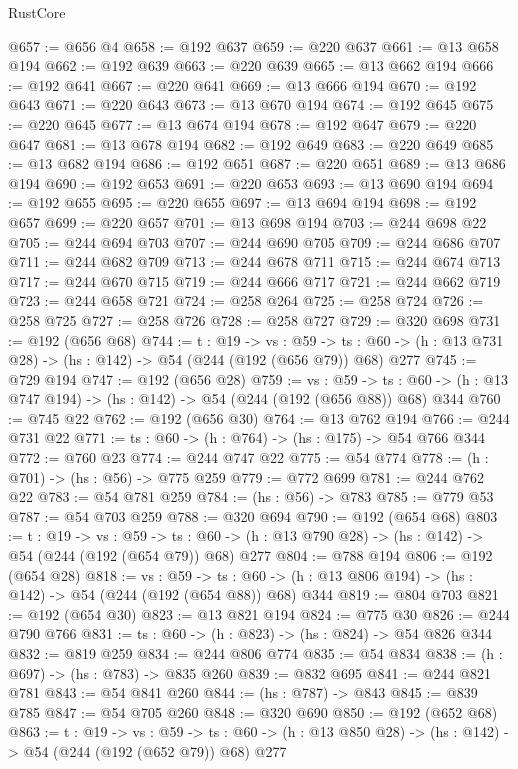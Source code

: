 \begin{lexlean}{RustCore}
\begin{coremodule}
@657 := @656 @4
@658 := @192 @637
@659 := @220 @637
@661 := @13 @658 @194
@662 := @192 @639
@663 := @220 @639
@665 := @13 @662 @194
@666 := @192 @641
@667 := @220 @641
@669 := @13 @666 @194
@670 := @192 @643
@671 := @220 @643
@673 := @13 @670 @194
@674 := @192 @645
@675 := @220 @645
@677 := @13 @674 @194
@678 := @192 @647
@679 := @220 @647
@681 := @13 @678 @194
@682 := @192 @649
@683 := @220 @649
@685 := @13 @682 @194
@686 := @192 @651
@687 := @220 @651
@689 := @13 @686 @194
@690 := @192 @653
@691 := @220 @653
@693 := @13 @690 @194
@694 := @192 @655
@695 := @220 @655
@697 := @13 @694 @194
@698 := @192 @657
@699 := @220 @657
@701 := @13 @698 @194
@703 := @244 @698 @22
@705 := @244 @694 @703
@707 := @244 @690 @705
@709 := @244 @686 @707
@711 := @244 @682 @709
@713 := @244 @678 @711
@715 := @244 @674 @713
@717 := @244 @670 @715
@719 := @244 @666 @717
@721 := @244 @662 @719
@723 := @244 @658 @721
@724 := @258 @264
@725 := @258 @724
@726 := @258 @725
@727 := @258 @726
@728 := @258 @727
@729 := @320 @698
@731 := @192 (@656 @68)
@744 := {t : @19} ->
  {vs : @59} ->
  {ts : @60} -> (h : @13 @731 @28) -> (hs : @142) -> @54 (@244 (@192 (@656 @79)) @68) @277
@745 := @729 @194
@747 := @192 (@656 @28)
@759 := {vs : @59} ->
  {ts : @60} -> (h : @13 @747 @194) -> (hs : @142) -> @54 (@244 (@192 (@656 @88)) @68) @344
@760 := @745 @22
@762 := @192 (@656 @30)
@764 := @13 @762 @194
@766 := @244 @731 @22
@771 := {ts : @60} -> (h : @764) -> (hs : @175) -> @54 @766 @344
@772 := @760 @23
@774 := @244 @747 @22
@775 := @54 @774
@778 := (h : @701) -> (hs : @56) -> @775 @259
@779 := @772 @699
@781 := @244 @762 @22
@783 := @54 @781 @259
@784 := (hs : @56) -> @783
@785 := @779 @53
@787 := @54 @703 @259
@788 := @320 @694
@790 := @192 (@654 @68)
@803 := {t : @19} ->
  {vs : @59} ->
  {ts : @60} -> (h : @13 @790 @28) -> (hs : @142) -> @54 (@244 (@192 (@654 @79)) @68) @277
@804 := @788 @194
@806 := @192 (@654 @28)
@818 := {vs : @59} ->
  {ts : @60} -> (h : @13 @806 @194) -> (hs : @142) -> @54 (@244 (@192 (@654 @88)) @68) @344
@819 := @804 @703
@821 := @192 (@654 @30)
@823 := @13 @821 @194
@824 := @775 @30
@826 := @244 @790 @766
@831 := {ts : @60} -> (h : @823) -> (hs : @824) -> @54 @826 @344
@832 := @819 @259
@834 := @244 @806 @774
@835 := @54 @834
@838 := (h : @697) -> (hs : @783) -> @835 @260
@839 := @832 @695
@841 := @244 @821 @781
@843 := @54 @841 @260
@844 := (hs : @787) -> @843
@845 := @839 @785
@847 := @54 @705 @260
@848 := @320 @690
@850 := @192 (@652 @68)
@863 := {t : @19} ->
  {vs : @59} ->
  {ts : @60} -> (h : @13 @850 @28) -> (hs : @142) -> @54 (@244 (@192 (@652 @79)) @68) @277

\end{coremodule}
\end{lexlean}
